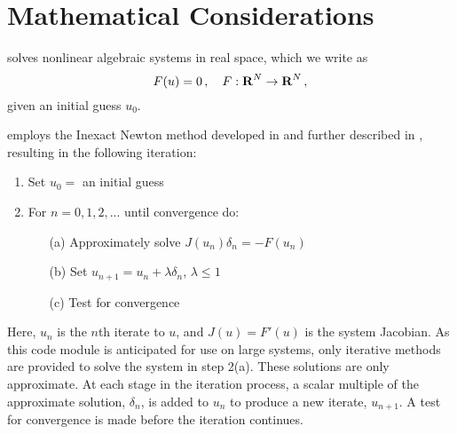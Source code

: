 \chapter{Mathematical Considerations}\label{s:math}

{\kinsol} solves nonlinear algebraic systems in real space, which
we write as 
\begin{equation}\label{nonlinear_system}
  F(u) = 0 \, , \quad F:\mbox{\bf R}^N \rightarrow \mbox{\bf R}^N \, ,
\end{equation}
given an initial guess $u_0$. 

{\kinsol} employs the Inexact Newton method developed in
\cite{BrSa:90,Bro:87,DES:82} and further described in
\cite{DeSc:96,Kel:95}, resulting in the following iteration:

 \vspace{1ex}
\begin{enumerate}
   \item Set $u_0 = $ an initial guess
   \item For $n = 0, 1, 2,...$ until convergence do:
      \begin{itemize}
          \item[(a)] Approximately solve $J(u_n)\delta_n = -
          F(u_n)$ \label{e:Newton}
          \item[(b)] Set $u_{n+1} = u_n + \lambda \delta_n$,
          $\lambda \leq 1$
          \item[(c)] Test for convergence
      \end{itemize}
\end{enumerate}
 Here, $u_n$ is the
$n$th iterate to $u$, and $J(u) = F'(u)$ is the system Jacobian.
As this code module is anticipated for use on large systems, only
iterative methods are provided to solve the system in step 2(a).
These solutions are only approximate.  At each stage in the
iteration process, a scalar multiple of the approximate solution,
$\delta_n$, is added to $u_n$ to produce a new iterate, $u_{n+1}$.
A test for convergence is made before the iteration continues.

